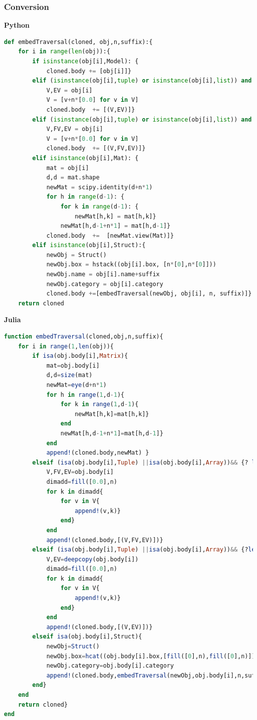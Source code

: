 \documentclass[a4paper,12pt]{article}
\begin{document}
\subsubsection{Conversion}
\textbf{Python}
\begin{lstlisting}[language=Python,format=Julia]
def embedTraversal(cloned, obj,n,suffix):{
    for i in range(len(obj)):{
        if isinstance(obj[i],Model): {
            cloned.body += [obj[i]]}
        elif (isinstance(obj[i],tuple) or isinstance(obj[i],list)) and {?(len(obj[i])==2):
            V,EV = obj[i]
            V = [v+n*[0.0] for v in V]
            cloned.body  += [(V,EV)]}
        elif (isinstance(obj[i],tuple) or isinstance(obj[i],list)) and {?(len(obj[i])==3):
            V,FV,EV = obj[i]
            V = [v+n*[0.0] for v in V]
            cloned.body  += [(V,FV,EV)]}
        elif isinstance(obj[i],Mat): {
            mat = obj[i]
            d,d = mat.shape
            newMat = scipy.identity(d+n*1)
            for h in range(d-1): {
                for k in range(d-1): {
                    newMat[h,k] = mat[h,k]}
                newMat[h,d-1+n*1] = mat[h,d-1]}
            cloned.body  +=  [newMat.view(Mat)]}
        elif isinstance(obj[i],Struct):{
            newObj = Struct()
            newObj.box = hstack((obj[i].box, [n*[0],n*[0]]))
            newObj.name = obj[i].name+suffix
            newObj.category = obj[i].category
            cloned.body +=[embedTraversal(newObj, obj[i], n, suffix)]}
    return cloned
\end{lstlisting}
\textbf{Julia}
\begin{lstlisting}[language=Julia,format=Julia]
function embedTraversal(cloned,obj,n,suffix){
	for i in range(1,len(obj)){
		if isa(obj.body[i],Matrix){
			mat=obj.body[i]
			d,d=size(mat)
			newMat=eye(d+n*1)
			for h in range(1,d-1){
				for k in range(1,d-1){
					newMat[h,k]=mat[h,k]}
				end
				newMat[h,d-1+n*1]=mat[h,d-1]}
			end
			append!(cloned.body,newMat) }
		elseif (isa(obj.body[i],Tuple) ||isa(obj.body[i],Array))&& {? length(obj.body[i])==3 
			V,FV,EV=obj.body[i]
			dimadd=fill([0.0],n)
			for k in dimadd{
				for v in V{
					append!(v,k)}
				end}
			end
			append!(cloned.body,[(V,FV,EV)])}
		elseif (isa(obj.body[i],Tuple) ||isa(obj.body[i],Array))&& {?length(obj.body[i])==2 
			V,EV=deepcopy(obj.body[i])
			dimadd=fill([0.0],n)
			for k in dimadd{
				for v in V{
					append!(v,k)}
				end}
			end
			append!(cloned.body,[(V,EV)])}
		elseif isa(obj.body[i],Struct){
			newObj=Struct()
			newObj.box=hcat((obj.body[i].box,[fill([0],n),fill([0],n)]))
			newObj.category=obj.body[i].category
			append!(cloned.body,embedTraversal(newObj,obj.body[i],n,suffix))}
		end}
	end
	return cloned}
end
\end{lstlisting}
\end{document}
